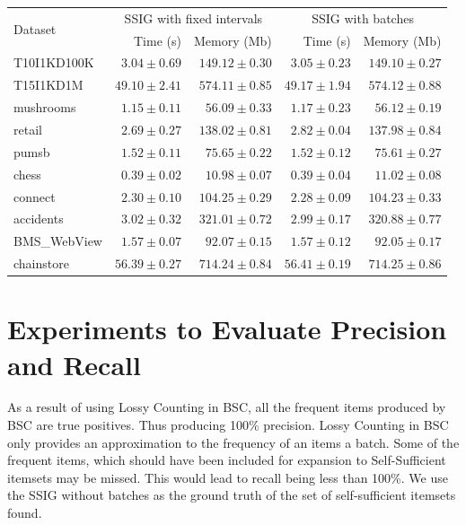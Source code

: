 \begin{table}[h!]
\begin{center}
\begin{tabular}{lrrrr}
    \toprule
    \multirow{2}{*}{Dataset} &
      \multicolumn{2}{c}{SSIG with fixed intervals} &
      \multicolumn{2}{c}{SSIG with batches} \\
      & {Time (s)} & {Memory (Mb)} & {Time (s)} & {Memory (Mb)} \\
      \midrule
    T10I1KD100K & {\(3.04\pm 0.69\)} & {\(149.12\pm 0.30\)} & {\(3.05\pm 0.23\)} & {\(149.10\pm 0.27\)} \\
    T15I1KD1M & {\(49.10\pm 2.41\)} & {\(574.11\pm 0.85\)} & {\(49.17\pm 1.94\)} & {\(574.12\pm 0.88\)} \\
    mushrooms & {\(1.15\pm 0.11\)} & {\(56.09\pm 0.33\)} & {\(1.17\pm 0.23\)} & {\(56.12\pm 0.19\)} \\
    retail & {\(2.69 \pm 0.27\)} & {\(138.02\pm 0.81\)}& {\(2.82\pm 0.04\)} & {\(137.98\pm 0.84\)}\\
    pumsb & {\(1.52\pm 0.11\)} & {\(75.65\pm0.22\)}& {\(1.52\pm0.12\)} & {\(75.61\pm 0.27\)}\\
    chess & {\(0.39\pm0.02\)} & {\(10.98\pm0.07\)}& {\(0.39\pm0.04\)} & {\(11.02\pm0.08\)}\\
    connect & {\(2.30\pm 0.10\)} & {\(104.25\pm0.29\)}& {\(2.28\pm0.09\)} & {\(104.23\pm0.33\)}\\
    accidents & {\(3.02\pm0.32\)} & {\(321.01\pm0.72\)}& {\(2.99\pm0.17\)} & {\(320.88\pm0.77\)}\\
    BMS\_WebView & {\(1.57\pm0.07\)} & {\(92.07\pm0.15\)}& {\(1.57\pm0.12\)} & {\(92.05\pm0.17\)}\\
    chainstore & {\(56.39\pm0.27\)} & {\(714.24\pm0.84\)}& {\(56.41\pm0.19\)} & {\(714.25\pm0.86\)}\\
    \bottomrule
\end{tabular}
\end{center}
\end{table}




\section{Experiments to Evaluate Precision and Recall}
As a result of using Lossy Counting \cite{lossy} in BSC, all the frequent items produced by BSC are true positives. Thus producing 100\% precision. Lossy Counting in BSC only provides an approximation to the frequency of an items a batch. Some of the frequent items, which should have been included for expansion to Self-Sufficient itemsets may be missed. This would lead to  recall being less than 100\%. We use the SSIG without batches as the ground truth of the set of self-sufficient itemsets found. 

